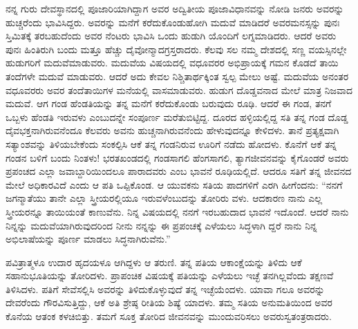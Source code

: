 ನನ್ನ ಗುರು ದೇವಸ್ಥಾನದಲ್ಲಿ ಪೂಜಾರಿಯಾಗಿದ್ದಾಗ ಅವರ ಅದ್ವಿತೀಯ ಪೂಜಾವಿಧಾನವನ್ನು ನೋಡಿ ಜನರು ಅವರನ್ನು ಹುಚ್ಚರೆಂದು ಭಾವಿಸಿದ್ದರು. ಅವರನ್ನು ಮನೆಗೆ ಕರೆದುಕೊಂಡುಹೋಗಿ ಮದುವೆ ಮಾಡಿದರೆ ಅವರಮನಸ್ಸನ್ನು ಪುನಃ ಸ್ತಿಮಿತಕ್ಕೆ ತರಬಹುದೆಂದು ಅವರ ನೆಂಟರು ಭಾವಿಸಿ ಒಂದು ಹುಡುಗಿ ಯೊಂದಿಗೆ ಲಗ್ನಮಾಡಿದರು. ಆದರೆ ಅವರು ಪುನಃ ಹಿಂತಿರುಗಿ ಬಂದು ಮತ್ತೂ ಹೆಚ್ಚು ದೈವೋನ್ಮಾದಗ್ರಸ್ತರಾದರು. ಕೆಲವು ಸಲ ನಮ್ಮ ದೇಶದಲ್ಲಿ ಸಣ್ಣ ವಯಸ್ಸಿನಲ್ಲೇ ಹುಡುಗರಿಗೆ ಮದುವೆಮಾಡುವರು. ಮದುವೆಯ ವಿಷಯದಲ್ಲಿ ವಧೂವರರ ಅಭಿಪ್ರಾಯಕ್ಕೆ ಗಮನ ಕೊಡದೆ ತಾಯಿ ತಂದೆಗಳೇ ಮದುವೆ ಮಾಡುವರು. ಆದರೆ ಅದು ಕೇವಲ ನಿಶ್ಚಿತಾರ್ಥಕ್ಕಿಂತ ಸ್ವಲ್ಪ ಮೇಲು ಅಷ್ಟೆ. ಮದುವೆಯ ಅನಂತರ ವಧೂವರರು ಅವರ ತಂದೆತಾಯಿಗಳ ಮನೆಯಲ್ಲಿ ವಾಸಮಾಡುವರು. ಹುಡುಗ ದೊಡ್ಡವನಾದ ಮೇಲೆ ಮಾತ್ರ ನಿಜವಾದ ಮದುವೆ. ಆಗ ಗಂಡ ಹೆಂಡತಿಯನ್ನು ತನ್ನ ಮನೆಗೆ ಕರೆದುಕೊಂಡು ಬರುವುದು ರೂಢಿ. ಆದರೆ ಈ ಗಂಡ, ತನಗೆ ಒಬ್ಬಳು ಹೆಂಡತಿ ಇರುವಳು ಎಂಬುದನ್ನೇ ಸಂಪೂರ್ಣ ಮರೆತುಬಿಟ್ಟಿದ್ದ. ದೂರದ ಹಳ್ಳಿಯಲ್ಲಿದ್ದ ಸತಿ ತನ್ನ ಗಂಡ ದೊಡ್ಡ ದೈವಭಕ್ತನಾಗಿರುವನೆಂದೂ ಕೆಲವರು ಅವನು ಹುಚ್ಚನಾಗಿರುವನೆಂದು ಹೇಳುವುದನ್ನೂ ಕೇಳಿದಳು. ತಾನೆ ಪ್ರತ್ಯಕ್ಷವಾಗಿ ಸತ್ಯಾಂಶವನ್ನು ತಿಳಿಯಬೇಕೆಂದು ಸಂಕಲ್ಪಿಸಿ ಆಕೆ ತನ್ನ ಗಂಡನಿರುವ ಊರಿಗೆ ನಡೆದು ಹೋದಳು. ಕೊನೆಗೆ ಆಕೆ ತನ್ನ ಗಂಡನ ಬಳಿಗೆ ಬಂದು ನಿಂತಳು! ಭರತಖಂಡದಲ್ಲಿ ಗಂಡಸಾಗಲಿ ಹೆಂಗಸಾಗಲಿ, ತ್ಯಾಗಜೀವನವನ್ನು ಕೈಗೊಂಡರೆ ಅವರು ಪ್ರಪಂಚದ ಎಲ್ಲಾ ಜವಾಬ್ದಾರಿಯಿಂದಲೂ ಪಾರಾದವರು ಎಂಬ ಭಾವನೆ ರೂಢಿಯಲ್ಲಿದೆ. ಆದರೂ ಸತಿಗೆ ತನ್ನ ಜೀವನದ ಮೇಲೆ ಅಧಿಕಾರವಿದೆ ಎಂದು ಆ ಪತಿ ಒಪ್ಪಿಕೊಂಡ. ಆ ಯುವಕನು ಸತಿಯ ಪಾದಗಳಿಗೆ ಎರಗಿ ಹೀಗೆಂದನು: “ನನಗೆ ಜಗನ್ಮಾತೆಯು ತಾನೇ ಎಲ್ಲಾ ಸ್ತ್ರೀಯರಲ್ಲಿಯೂ ಇರುವಳೆಂಬುದನ್ನು ತೋರಿರು ವಳು. ಆದಕಾರಣ ನಾನು ಎಲ್ಲ ಸ್ತ್ರೀಯರನ್ನೂ ತಾಯಿಯಂತೆ ಕಾಣುವೆನು. ನಿನ್ನ ವಿಷಯದಲ್ಲಿ ನನಗೆ ಇರಬಹುದಾದ ಭಾವನೆ ಇದೊಂದೆ. ಆದರೆ ನಾನು ನಿನ್ನನ್ನು ಮದುವೆಯಾಗಿರುವುದರಿಂದ ನೀನು ನನ್ನನ್ನು ಈ ಪ್ರಪಂಚಕ್ಕೆ ಎಳೆಯಲು ಸಿದ್ಧಳಾಗಿ ದ್ದರೆ ನಾನು ನಿನ್ನ ಅಭಿಲಾಷೆಯನ್ನು ಪೂರ್ಣ ಮಾಡಲು ಸಿದ್ಧನಾಗಿರುವೆನು.”

ಪವಿತ್ರಾತ್ಮಳೂ ಉದಾರ ಹೃದಯಳೂ ಆಗಿದ್ದಳು ಆ ತರುಣಿ. ತನ್ನ ಪತಿಯ ಆಕಾಂಕ್ಷೆಯನ್ನು ತಿಳಿದು ಆಕೆ ಸಹಾನುಭೂತಿಯನ್ನು ತೋರಿದಳು. ಪ್ರಾಪಂಚಿಕ ವಿಷಯಕ್ಕೆ ಪತಿಯನ್ನು ಎಳೆಯಲು ಇಚ್ಛೆ ತನಗಿಲ್ಲವೆಂದು ತಕ್ಷಣವೆ ತಿಳಿಸಿದಳು. ಪತಿಗೆ ಸೇವೆಸಲ್ಲಿಸಿ ಅವರನ್ನು ತಿಳಿದುಕೊಳ್ಳುವುದೆ ತನ್ನ ಇಚ್ಛೆಯೆಂದಳು. ಯಾವಾ ಗಲೂ ಅವರನ್ನು ದೇವರೆಂದು ಗೌರವಿಸುತ್ತಿದ್ದು, ಆಕೆ ಅತಿ ಶ್ರೇಷ್ಠ ರೀತಿಯ ಶಿಷ್ಯೆ ಯಾದಳು. ತಮ್ಮ ಸತಿಯ ಅನುಮತಿಯಿಂದ ಅವರ ಕೊನೆಯ ಆತಂಕ ಕಳಚಿಬಿತ್ತು. ತಮಗೆ ಸೂಕ್ತ ತೋರಿದ ಜೀವನವನ್ನು ಮುಂದುವರಿಸಲು ಅವರುಸ್ವತಂತ್ರರಾದರು.

